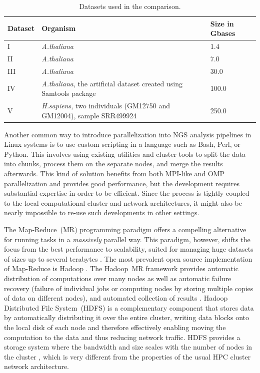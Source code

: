 \documentclass{bioinfo}
\begin{document}
\begin{table}[!ht]
\small
\footnotesize
\caption{Datasets used in the comparison. }
\begin{center}
\begin{tabular}{|l|l|l|}
Dataset &	Organism &	Size in Gbases\\
\hline
 I		&	{\it A.thaliana}	&	1.4	\\
 II	&	{\it A.thaliana}	&	7.0\\
 III	&	{\it A.thaliana}	&	30.0	\\
 IV	&{\it A.thaliana}, the artificial dataset created using Samtools package	&	100.0	\\
 V	&	{\it H.sapiens}, two individuals (GM12750 and GM12004), sample SRR499924		&	250.0\\

\end{tabular}
\end{center}
\label{table:datasets}
\normalsize
\end{table}%



Another common way to introduce parallelization into NGS analysis pipelines in Linux systems is to use custom scripting in a language such as Bash, Perl, or Python. This involves using existing utilities and cluster tools to split the data into chunks, process them on the separate nodes, and merge the results afterwards. This kind of solution benefits from both MPI-like and OMP parallelization and provides good performance, but the development requires substantial expertise in order to be efficient. Since the process is tightly coupled to the local computational cluster and network architectures, it might also be nearly impossible to re-use such developments in other settings.

The Map-Reduce~(MR) programming paradigm \citep{dean.2004.mapreduce} offers a compelling alternative for running tasks in a {\it massively} parallel way. This paradigm, however, shifts the focus from the best performance to scalability, suited for managing huge datasets of sizes up to several terabytes \citep{lin2010}.
The most prevalent open source implementation of Map-Reduce is Hadoop \citep{hadoop,Hadoop:Guide}.
The Hadoop~MR framework provides automatic distribution of computations over many nodes as well as automatic failure recovery (failure of individual jobs or computing nodes by storing multiple copies of data on different nodes), and automated collection of results \citep{Hadoop:Guide}. Hadoop Distributed File System~(HDFS) is a complementary component that stores data by automatically distributing it over the entire cluster, writing data blocks onto the local disk of each node and therefore effectively enabling moving the computation to the data and thus reducing network traffic. HDFS provides a storage system where the bandwidth and size scales with the number of nodes in the cluster \citep{Sammer:2012}, which is very different from the properties of the usual HPC cluster network architecture.
\end{document}
